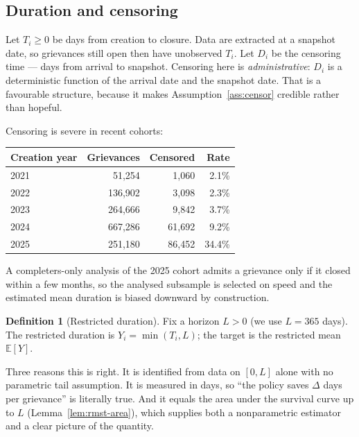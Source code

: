 \documentclass[11pt,a4paper]{article}
\theoremstyle{plain}
\theoremstyle{definition}
\newtheorem{definition}[theorem]{Definition}
\theoremstyle{remark}
\newcommand{\E}{\mathbb E}
\begin{document}
\subsection{Duration and censoring}\label{sec:duration}

Let $T_i\ge0$ be days from creation to closure. Data are extracted at a snapshot date, so
grievances still open then have unobserved $T_i$. Let $D_i$ be the censoring time --- days from
arrival to snapshot. Censoring here is \emph{administrative}: $D_i$ is a deterministic function
of the arrival date and the snapshot date. That is a favourable structure, because it makes
Assumption~\ref{ass:censor} credible rather than hopeful.

Censoring is severe in recent cohorts:

\begin{center}
\begin{tabular}{lrrr}
\toprule
Creation year & Grievances & Censored & Rate\\
\midrule
2021 & 51,254 & 1,060 & 2.1\%\\
2022 & 136,902 & 3,098 & 2.3\%\\
2023 & 264,666 & 9,842 & 3.7\%\\
2024 & 667,286 & 61,692 & 9.2\%\\
2025 & 251,180 & 86,452 & 34.4\%\\
\bottomrule
\end{tabular}
\end{center}

A completers-only analysis of the 2025 cohort admits a grievance only if it closed within a few
months, so the analysed subsample is selected on speed and the estimated mean duration is biased
downward by construction.

\begin{definition}[Restricted duration]\label{def:rmst}
Fix a horizon $L>0$ (we use $L=365$ days). The restricted duration is $Y_i=\min(T_i,L)$; the
target is the restricted mean $\E[Y]$.
\end{definition}

Three reasons this is right. It is identified from data on $[0,L]$ alone with no parametric tail
assumption. It is measured in days, so ``the policy saves $\Delta$ days per grievance'' is
literally true. And it equals the area under the survival curve up to $L$
(Lemma~\ref{lem:rmst-area}), which supplies both a nonparametric estimator and a clear picture
of the quantity.

\end{document}
